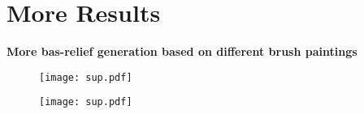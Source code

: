 \section{More Results}
\textbf{More bas-relief generation based on different brush paintings}
\begin{figure}
	\centering
	\texttt{[image: sup.pdf]}
\end{figure}

\begin{figure}
	\centering
	\texttt{[image: sup.pdf]}
\end{figure}
